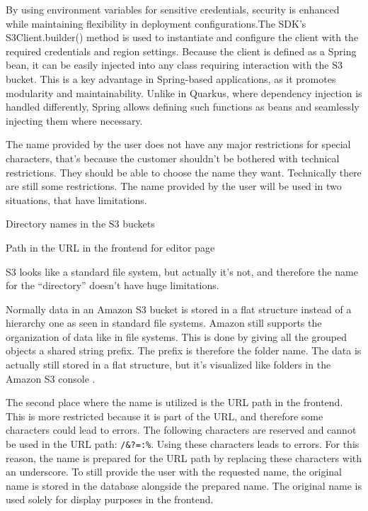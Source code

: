 By using environment variables for sensitive credentials, security is enhanced while maintaining flexibility in deployment configurations.The SDK’s S3Client.builder() method is used to instantiate and configure the client with the required credentials and region settings. Because the client is defined as a Spring bean, it can be easily injected into any class requiring interaction with the S3 bucket. This is a key advantage in Spring-based applications, as it promotes modularity and maintainability. Unlike in Quarkus, where dependency injection is handled differently, Spring allows defining such functions as beans and seamlessly injecting them where necessary.

The name provided by the user does not have any major restrictions for special characters, that's because the customer shouldn't be bothered with technical restrictions. They should be able to choose the name they want. Technically there are still some restrictions. The name provided by the user will be used in two situations, that have limitations. 
\begin{compactenum}
    \item Directory names in the S3 buckets
    \item Path in the URL in the frontend for editor page
\end{compactenum}

S3 looks like a standard file system, but actually it's not, and therefore the name for the ``directory'' doesn't have huge limitations. 

Normally data in an Amazon S3 bucket is stored in a flat structure instead of a hierarchy one as seen in standard file systems. Amazon still supports the organization of data like in file systems. This is done by giving all the grouped objects a shared string prefix. The prefix is therefore the folder name. The data is actually still stored in a flat structure, but it's visualized like folders in the Amazon S3 console \cite{AWSUsingFolders}.

The second place where the name is utilized is the URL path in the frontend. This is more restricted because it is part of the URL, and therefore some characters could lead to errors. The following characters are reserved and cannot be used in the URL path: \texttt{/\&?=:\%}. Using these characters leads to errors. For this reason, the name is prepared for the URL path by replacing these characters with an underscore. To still provide the user with the requested name, the original name is stored in the database alongside the prepared name. The original name is used solely for display purposes in the frontend.

